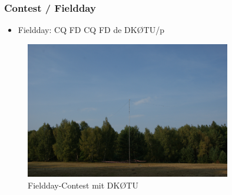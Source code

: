 \begin{frame}
  \frametitle{Contest / Fieldday}

  \begin{itemize}
    \item Fieldday: CQ FD CQ FD de DKØTU/p
  \end{itemize}

  \begin{center}
    \begin{figure}
      \includegraphics[width=0.8\textwidth,height=.7\textheight,keepaspectratio]{bv10/2014-09-06_160906.jpg}
      \caption{Fieldday-Contest mit DKØTU \hyperlink{refs}{\cite{blog}}}
    \end{figure}
  \end{center}

\end{frame}

